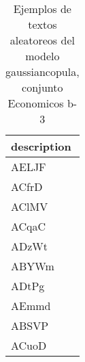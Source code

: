 \begin{table}[H]
\centering
\fontsize{8}{14}\selectfont
\caption{Ejemplos de textos aleatoreos del modelo gaussiancopula, conjunto Economicos b-3}
\label{table-sample10-economicos-b-3-gaussiancopula-text}
\begin{tabular}{|m{50em}|}
\hline
\rowcolor[gray]{0.8}
description \\
\hline AELJF \\
\hline ACfrD \\
\hline AClMV \\
\hline ACqaC \\
\hline ADzWt \\
\hline ABYWm \\
\hline ADtPg \\
\hline AEmmd \\
\hline ABSVP \\
\hline ACuoD \\
\hline
\end{tabular}
\end{table}
